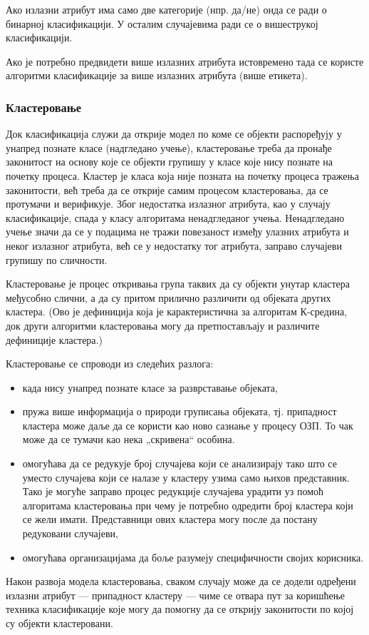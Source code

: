 Ако излазни атрибут има само две категорије (нпр. да/не) онда се ради о бинарној класификацији. У осталим случајевима ради се о вишеструкој класификацији.

Ако је потребно предвидети више излазних атрибута истовремено тада се користе алгоритми класификације за више излазних атрибута (више етикета).

\subsubsection{Кластеровање}
Док класификација служи да открије модел по коме се објекти распоређују у унапред познате класе (надгледано учење), кластеровање треба да пронађе законитост на основу које се објекти групишу у класе које нису познате на почетку процеса. Кластер је класа која није позната на почетку процеса тражења законитости, већ треба да се открије самим процесом кластеровања, да се протумачи и верификује. Због недостатка излазног атрибута, као у случају класификације, спада у класу алгоритама ненадгледаног учења. Ненадгледано учење значи да се у подацима не тражи повезаност између улазних атрибута и неког излазног атрибута, већ се у недостатку тог атрибута, заправо случајеви групишу по сличности.

Кластеровање је процес откривања група таквих да су објекти унутар кластера међусобно слични, а да су притом прилично различити од објеката других кластера. (Ово је дефиниција која је карактеристична за алгоритам К-средина, док други алгоритми кластеровања могу да претпостављају и различите дефиниције кластера.)

Кластеровање се спроводи из следећих разлога:

\begin{itemize}
  \item када нису унапред познате класе за разврставање објеката,
  \item пружа више информација о природи груписања објеката, тј. припадност кластера може даље да се користи као ново сазнање у процесу ОЗП. То чак може да се тумачи као нека „скривена“ особина.
  \item омогућава да се редукује број случајева који се анализирају тако што се уместо случајева који се налазе у кластеру узима само њихов представник. Тако је могуће заправо процес редукције случајева урадити уз помоћ алгоритама кластеровања при чему је потребно одредити број кластера који се жели имати. Представници ових кластера могу после да постану редуковани случајеви,
  \item омогућава организацијама да боље разумеју специфичности својих корисника.
\end{itemize}
Након развоја модела кластеровања, сваком случају може да се додели одређени излазни атрибут — припадност кластеру — чиме се отвара пут за коришћење техника класификације које могу да помогну да се открију законитости по којој су објекти кластеровани.

